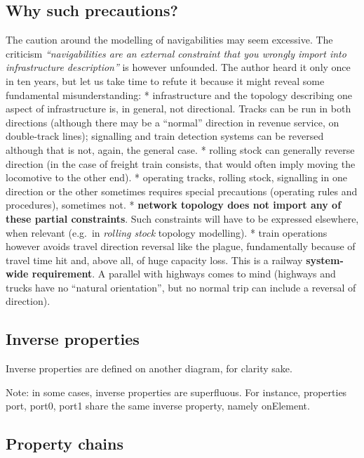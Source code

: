 \documentclass[
  11pt,
]{article}
\begin{document}
\hypertarget{why-such-precautions}{%
\subsection{Why such precautions?}\label{why-such-precautions}}

The caution around the modelling of navigabilities may seem excessive.
The criticism \emph{``navigabilities are an external constraint that you
wrongly import into infrastructure description''} is however unfounded.
The author heard it only once in ten years, but let us take time to
refute it because it might reveal some fundamental misunderstanding: *
infrastructure and the topology describing one aspect of infrastructure
is, in general, not directional. Tracks can be run in both directions
(although there may be a ``normal'' direction in revenue service, on
double-track lines); signalling and train detection systems can be
reversed although that is not, again, the general case. * rolling stock
can generally reverse direction (in the case of freight train consists,
that would often imply moving the locomotive to the other end). *
operating tracks, rolling stock, signalling in one direction or the
other sometimes requires special precautions (operating rules and
procedures), sometimes not. * \textbf{network topology does not import
any of these partial constraints}. Such constraints will have to be
expressed elsewhere, when relevant (e.g.~in \emph{rolling stock}
topology modelling). * train operations however avoids travel direction
reversal like the plague, fundamentally because of travel time hit and,
above all, of huge capacity loss. This is a railway \textbf{system-wide
requirement}. A parallel with highways comes to mind (highways and
trucks have no ``natural orientation'', but no normal trip can include a
reversal of direction).

\hypertarget{inverse-properties}{%
\subsection{Inverse properties}\label{inverse-properties}}

Inverse properties are defined on another diagram, for clarity sake.

Note: in some cases, inverse properties are superfluous. For instance,
properties port, port0, port1 share the same inverse property, namely
onElement.

\hypertarget{property-chains}{%
\subsection{Property chains}\label{property-chains}}
\end{document}
